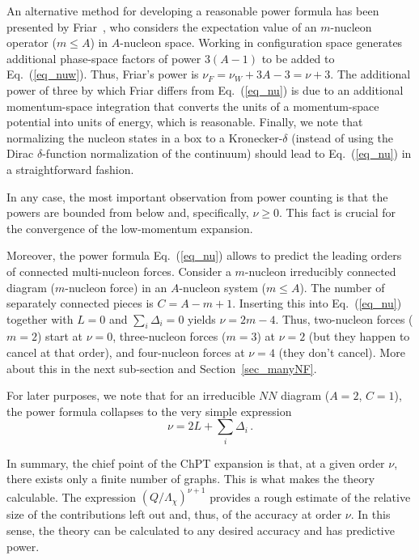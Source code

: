 \documentclass[sort&compress,preprint,3p]{elsarticle}
\begin{document}
An alternative method for developing a reasonable
power formula has been presented by Friar~\cite{Fri97},
who considers the expectation value of an $m$-nucleon operator 
($m\leq A$) in $A$-nucleon space.
Working in configuration space generates additional
phase-space factors of power $3(A-1)$
to be added to Eq.~(\ref{eq_nuw}).
Thus, Friar's power is $\nu_F =\nu_W +3A-3=\nu+3$.
The additional power of three by which Friar differs from
Eq.~(\ref{eq_nu})
is due to an additional momentum-space integration
that converts the units of a momentum-space potential
into units of energy, which is reasonable.
Finally, we note that
normalizing the
nucleon states in a box to a Kronecker-$\delta$ (instead of
using the Dirac $\delta$-function normalization of the continuum)
should lead to Eq.~(\ref{eq_nu}) 
in a straightforward fashion.

In any case,
the most important observation from power counting is that
the powers are bounded from below and, 
specifically, $\nu \geq 0$. 
This fact is crucial for the convergence of 
the low-momentum expansion.

Moreover, the power formula 
Eq.~(\ref{eq_nu}) 
allows to predict
the leading orders of connected multi-nucleon forces.
Consider a $m$-nucleon irreducibly connected diagram
($m$-nucleon force) in an $A$-nucleon system ($m\leq A$).
The number of separately connected pieces is
$C=A-m+1$. Inserting this into
Eq.~(\ref{eq_nu}) together with $L=0$ and 
$\sum_i \Delta_i=0$ yields
$\nu=2m-4$. Thus, two-nucleon forces ($m=2$) start 
at $\nu=0$, three-nucleon forces ($m=3$) at
$\nu=2$ (but they happen to cancel at that order),
and four-nucleon forces at $\nu=4$ (they don't cancel).
More about this in the next sub-section and 
Section~\ref{sec_manyNF}.

For later purposes, we note that for an irreducible 
$NN$ diagram ($A=2$, $C=1$), the
power formula collapses to the very simple expression
\begin{equation}
\nu =  2L + \sum_i \Delta_i \,.
\label{eq_nunn}
\end{equation}

In summary, the chief point of the ChPT expansion is
that,
at a given order $\nu$, there exists only a finite number
of graphs. This is what makes the theory calculable.
The expression $(Q/\Lambda_\chi)^{\nu+1}$ provides a rough estimate
of the relative size of the contributions left out and, thus,
of the accuracy at order $\nu$.
In this sense, the theory can be calculated to any
desired accuracy and has
predictive power.
\end{document}
